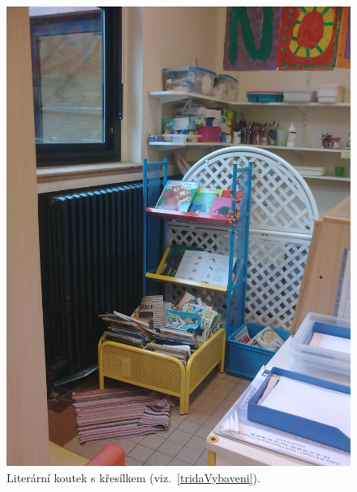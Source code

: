 	\begin{figure}[tb]
		\centering
		\includegraphics[height = 0.35\textheight]{./fotky/Obr3.jpg}
		\caption{
			Literární koutek s křesílkem (viz.~\ref{tridaVybaveni}).
		}
		\label{Obr3}
	\end{figure}

